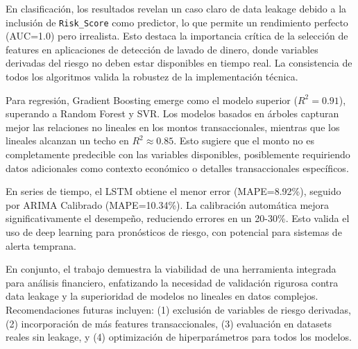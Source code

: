 \documentclass[12pt]{article}
\begin{document}
En clasificación, los resultados revelan un caso claro de data leakage debido a la inclusión de \texttt{Risk\_Score} como predictor, lo que permite un rendimiento perfecto (AUC=1.0) pero irrealista. Esto destaca la importancia crítica de la selección de features en aplicaciones de detección de lavado de dinero, donde variables derivadas del riesgo no deben estar disponibles en tiempo real. La consistencia de todos los algoritmos valida la robustez de la implementación técnica.

Para regresión, Gradient Boosting emerge como el modelo superior ($R^2=0.91$), superando a Random Forest y SVR. Los modelos basados en árboles capturan mejor las relaciones no lineales en los montos transaccionales, mientras que los lineales alcanzan un techo en $R^2\approx0.85$. Esto sugiere que el monto no es completamente predecible con las variables disponibles, posiblemente requiriendo datos adicionales como contexto económico o detalles transaccionales específicos.

En series de tiempo, el LSTM obtiene el menor error (MAPE=8.92\%), seguido por ARIMA Calibrado (MAPE=10.34\%). La calibración automática mejora significativamente el desempeño, reduciendo errores en un 20-30\%. Esto valida el uso de deep learning para pronósticos de riesgo, con potencial para sistemas de alerta temprana.

En conjunto, el trabajo demuestra la viabilidad de una herramienta integrada para análisis financiero, enfatizando la necesidad de validación rigurosa contra data leakage y la superioridad de modelos no lineales en datos complejos. Recomendaciones futuras incluyen: (1) exclusión de variables de riesgo derivadas, (2) incorporación de más features transaccionales, (3) evaluación en datasets reales sin leakage, y (4) optimización de hiperparámetros para todos los modelos.
\end{document}
